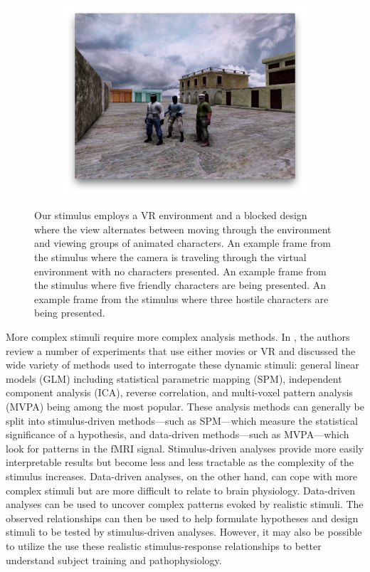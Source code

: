 \documentclass[preprint,5p,authoryear]{elsarticle}
\begin{document}
\begin{figure}
\begin{subfigure}{0.3\textwidth}
\includegraphics[width=\textwidth]{figures/stimulus-three-insurgents}
\caption{}
\label{fig:stimulus-three-insurgents}
\end{subfigure}
\caption{
Our stimulus employs a VR environment and a blocked design where the view alternates between moving through the environment and viewing groups of animated characters.
 An example frame from the stimulus where the camera is traveling through the virtual environment with no characters presented.
 An example frame from the stimulus where five friendly characters are being presented.
 An example frame from the stimulus where three hostile characters are being presented.}
\label{fig:stimulus}
\end{figure}

More complex stimuli require more complex analysis methods.
In \cite{Spiers2007}, the authors review a number of experiments that use either movies or VR and discussed the wide variety of methods used to interrogate these dynamic stimuli: general linear models (GLM) including statistical parametric mapping (SPM), independent component analysis (ICA), reverse correlation, and multi-voxel pattern analysis (MVPA) being among the most popular.
These analysis methods can generally be split into stimulus-driven methods---such as SPM---which measure the statistical significance of a hypothesis, and data-driven methods---such as MVPA---which look for patterns in the fMRI signal.
Stimulus-driven analyses provide more easily interpretable results but become less and less tractable as the complexity of the stimulus increases.
Data-driven analyses, on the other hand, can cope with more complex stimuli but are more difficult to relate to brain physiology.
Data-driven analyses can be used to uncover complex patterns evoked by realistic stimuli. The observed relationships can then be used to help formulate hypotheses and design stimuli to be tested by stimulus-driven analyses. However, it may also be possible to utilize the use these realistic stimulus-response relationships to better understand subject training and pathophysiology.
\end{document}

